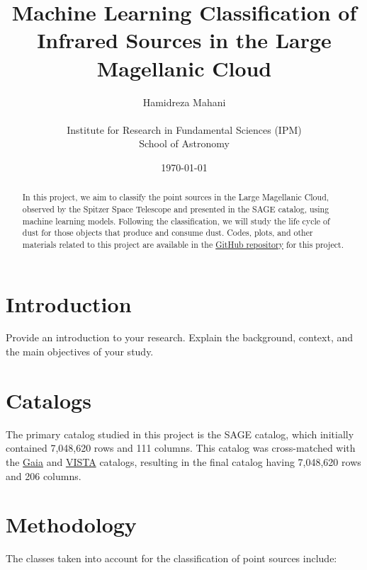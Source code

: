 \documentclass[a4paper, 15pt,usenatbib]{article}
\title{Machine Learning Classification of Infrared
Sources in the Large Magellanic Cloud}
\author{Hamidreza Mahani \\
    \\
        Institute for Research in Fundamental Sciences (IPM) \\
        School of Astronomy}
\date{\today}
\begin{document}
\maketitle

\begin{abstract}
    In this project, we aim to classify the point sources in the Large Magellanic Cloud, observed by the Spitzer Space Telescope and presented in the SAGE catalog, using machine learning models. Following the classification, we will study the life cycle of dust for those objects that produce and consume dust. Codes, plots, and other materials related to this project are available in the \href{https://github.com/hmahani/LMC_Machine_Learning}{GitHub repository} for this project.
\end{abstract}

\tableofcontents
\newpage

\section{Introduction}
Provide an introduction to your research. Explain the background, context, and the main objectives of your study. 

\section{Catalogs}
The primary catalog studied in this project is the SAGE catalog, which initially contained 7,048,620 rows and 111 columns. This catalog was cross-matched with the \href{https://vizier.cds.unistra.fr/viz-bin/VizieR-3?-source=I/350&-out.max=50&-out.form=HTML%20Table&-out.add=_r&-out.add=_RAJ,_DEJ&-sort=_r&-oc.form=sexa}{Gaia} \citep{GaiaDR3} and \href{https://vizier.cds.unistra.fr/viz-bin/VizieR-3?-source=II/375&-out.max=50&-out.form=HTML%20Table&-out.add=_r&-out.add=_RAJ,_DEJ&-sort=_r&-oc.form=sexa}{VISTA} \citep{Cioni11_Vista} catalogs, resulting in the final catalog having 7,048,620 rows and 206 columns.

\section{Methodology}
The classes taken into account for the classification of point sources include:
\end{document}
